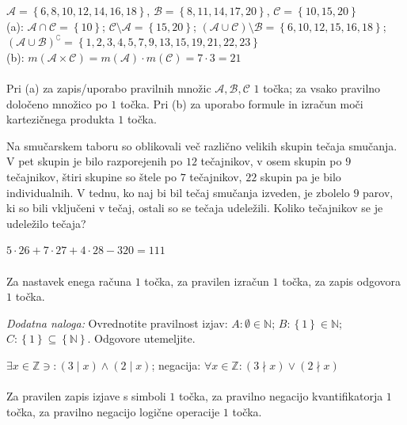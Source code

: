 \documentclass[addpoints,11pt]{exam}
\begin{document}
\begin{questions}
    \begin{solution}[13cm]
        $\mathcal{A}=\left\{6,8,10,12,14,16,18\right\}$, $\mathcal{B}=\left\{8,11,14,17,20\right\}$, $\mathcal{C}=\left\{10,15,20\right\}$ \\
        (a): $\mathcal{A}\cap\mathcal{C}=\left\{10\right\}$; $\mathcal{C}\setminus\mathcal{A}=\left\{15,20\right\}$; $(\mathcal{A}\cup\mathcal{C})\setminus\mathcal{B}=\left\{6,10,12,15,16,18\right\}$; $(\mathcal{A}\cup\mathcal{B})^\complement=\left\{1,2,3,4,5,7,9,13,15,19,21,22,23\right\}$ \\
        (b): $m(\mathcal{A}\times\mathcal{C})=m(\mathcal{A})\cdot m(\mathcal{C})=7\cdot 3 = 21$ \\ \\
        Pri (a) za zapis/uporabo pravilnih množic $\mathcal{A}, \mathcal{B}, \mathcal{C}$ $1$ točka; za vsako pravilno določeno množico po $1$ točka. Pri (b) za uporabo formule in izračun moči kartezičnega produkta $1$ točka.
    \end{solution}



\newpage
    \question[3]
    Na smučarskem taboru so oblikovali več različno velikih skupin tečaja smučanja.
    V pet skupin je bilo razporejenih po $12$ tečajnikov, v osem skupin po $9$ tečajnikov, štiri skupine so štele po $7$ tečajnikov, $22$ skupin pa je bilo individualnih.
    V tednu, ko naj bi bil tečaj smučanja izveden, je zbolelo $9$ parov, ki so bili vključeni v tečaj, ostali so se tečaja udeležili.
    Koliko tečajnikov se je udeležilo tečaja?

    \begin{solution}[5cm]
        $5\cdot 26+7\cdot 27+4\cdot 28-320=111$ \\ \\
        Za nastavek enega računa $1$ točka, za pravilen izračun $1$ točka, za zapis odgovora $1$ točka.
    \end{solution}


\newpage


    \bonusquestion[3]
    \textit{Dodatna naloga:} Ovrednotite pravilnost izjav: $A: \emptyset\in\mathbb{N}$; $B:\left\{1\right\}\in\mathbb{N}$; $C: \left\{1\right\}\subseteq\left\{\mathbb{N}\right\}$. Odgovore utemeljite.
    \begin{solution}
        $\exists x\in\mathbb{Z}\ni:(3\mid x)\land(2\mid x)$; negacija: $\forall x\in\mathbb{Z}: (3\nmid x)\lor(2\nmid x)$ \\ \\
        Za pravilen zapis izjave s simboli $1$ točka, za pravilno negacijo kvantifikatorja $1$ točka, za pravilno negacijo logične operacije $1$ točka.
    \end{solution}

\end{questions}
\end{document}
